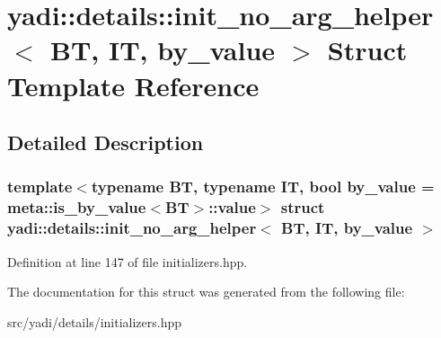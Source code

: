 \hypertarget{structyadi_1_1details_1_1init__no__arg__helper}{}\section{yadi\+:\+:details\+:\+:init\+\_\+no\+\_\+arg\+\_\+helper$<$ BT, IT, by\+\_\+value $>$ Struct Template Reference}
\label{structyadi_1_1details_1_1init__no__arg__helper}


\subsection{Detailed Description}
\subsubsection*{template$<$typename BT, typename IT, bool by\+\_\+value = meta\+::is\+\_\+by\+\_\+value$<$\+B\+T$>$\+::value$>$\newline
struct yadi\+::details\+::init\+\_\+no\+\_\+arg\+\_\+helper$<$ B\+T, I\+T, by\+\_\+value $>$}



Definition at line 147 of file initializers.\+hpp.



The documentation for this struct was generated from the following file\+:\begin{DoxyCompactItemize}
\item 
src/yadi/details/initializers.\+hpp\end{DoxyCompactItemize}
